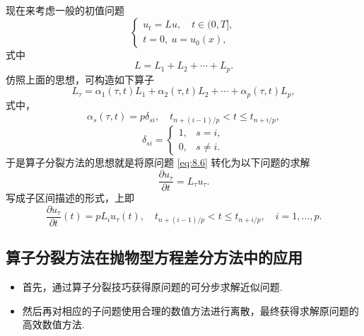 现在来考虑一般的初值问题
\begin{equation}\label{eq:8.6}
    \begin{cases}
        u_t = Lu, \quad t \in (0, T], \\
        t = 0, \ u = u_0(x),
    \end{cases}
\end{equation}
式中
\begin{equation*}
    L = L_1 + L_2 + \cdots + L_p.
\end{equation*}
仿照上面的思想，可构造如下算子
\begin{equation*}
    L_\tau = \alpha_1(\tau, t)L_1 + \alpha_2(\tau, t)L_2 + \cdots + \alpha_p(\tau, t)L_p,
\end{equation*}
式中，
\begin{equation*}
    \alpha_s(\tau, t) = p \delta_{si}, \quad t_{n+(i-1)/p} < t \leq t_{n+i/p},
\end{equation*}
\begin{equation*}
    \delta_{si} = \begin{cases}
        1, & s = i, \\
        0, & s \neq i.
    \end{cases}
\end{equation*}
于是算子分裂方法的思想就是将原问题 \eqref{eq:8.6} 转化为以下问题的求解
\begin{equation*}
    \frac{\partial u_\tau}{\partial t} = L_\tau u_\tau.
\end{equation*}
写成子区间描述的形式，上即
\begin{equation*}
    \frac{\partial u_\tau}{\partial t}(t) = p L_i u_\tau(t), \quad t_{n+(i-1)/p} < t \leq t_{n+i/p}, \quad i = 1, \dots, p.
\end{equation*}

\subsection{算子分裂方法在抛物型方程差分方法中的应用}

\begin{note}[算子分裂方法实施步骤]
\begin{itemize}
    \item 首先，通过算子分裂技巧获得原问题的可分步求解近似问题.
    \item 然后再对相应的子问题使用合理的数值方法进行离散，最终获得求解原问题的高效数值方法.
\end{itemize}
\end{note}

